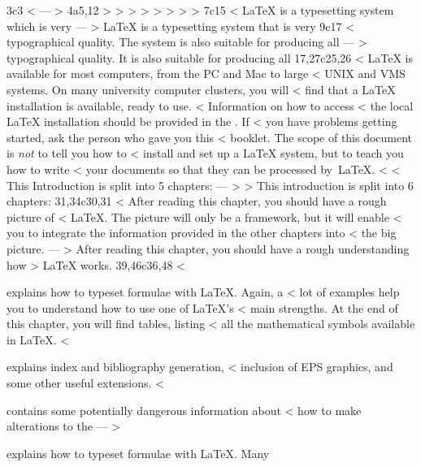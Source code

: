 3c3
< %
---
> %
4a5,12
> 
> %
> %
> %
> %
> %
> %
> 
7c15
< \LaTeX{} \cite{manual} is a typesetting system which is very 
---
> \LaTeX{} \cite{manual} is a typesetting system that is very 
9c17
< typographical quality. The system is also suitable for producing all
---
> typographical quality. It is also suitable for producing all
17,27c25,26
< \LaTeX{} is available for most computers, from the PC and Mac to large
< UNIX and VMS systems. On many university computer clusters, you will
< find that a \LaTeX{} installation is available, ready to use.
< Information on how to access
< the local \LaTeX{} installation should be provided in the \guide. If
< you have problems getting started, ask the person who gave you this
< booklet. The scope of this document is \emph{not} to tell you how to
< install and set up a \LaTeX{} system, but to teach you how to write
< your documents so that they can be processed by~\LaTeX{}.
< 
< \noindent This Introduction is split into 5 chapters:
---
> \bigskip
> \noindent This introduction is split into 6 chapters:
31,34c30,31
<   After reading this chapter, you should have a rough picture of
<   \LaTeX{}. The picture will only be a framework, but it will enable
<   you to integrate the information provided in the other chapters into
<   the big picture.
---
>   After reading this chapter, you should have a rough understanding how
>   \LaTeX{} works.
39,46c36,48
< \item[Chapter 3] explains how to typeset formulae with \LaTeX. Again, a
<   lot of examples help you to understand how to use one of \LaTeX{}'s
<   main strengths. At the end of this chapter, you will find tables, listing
<   all the mathematical symbols available in \LaTeX{}.
< \item[Chapter 4] explains index and  bibliography generation,
<   inclusion of EPS graphics, and some other useful extensions.
< \item[Chapter 5] contains some potentially dangerous information about
<   how to make alterations to the
---
> \item[Chapter 3] explains how to typeset formulae with \LaTeX. Many
